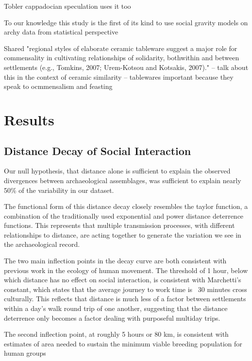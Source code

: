 \documentclass[fleqn,10pt]{wlscirep}
\begin{document}
Tobler cappadocian speculation uses it too

To our knowledge this study is the first of its kind to use social gravity models on archy data from statistical perspective




Shared
"regional styles of elaborate ceramic tableware suggest a major role for commensality in cultivating relationships of solidarity, bothwithin and between settlements (e.g., Tomkins, 2007; Urem-Kotsou
and Kotsakis, 2007)." -- talk about this in the context of ceramic similarity -- tablewares important because they speak to ocmmensalism and feasting

\section*{Results}

\subsection*{Distance Decay of Social Interaction}
Our null hypothesis, that distance alone is sufficient to explain the observed divergences between archaeological assemblages, was sufficient to explain nearly 50\% of the variability in our dataset. 

The functional form of this distance decay closely resembles the taylor function, a combination of the traditionally used exponential and power distance deterrence functions. This represents that multiple transmission processes, with different relationships to distance, are acting together to generate the variation we see in the archaeological record.

The two main inflection points in the decay curve are both consistent with previous work in the ecology of human movement. The threshold of 1 hour, below which distance has no effect on social interaction, is consistent with Marchetti's constant, which states that the average journey to work time is ~30 minutes cross culturally. This reflects that distance is much less of a factor between settlements within a day's walk round trip of one another, suggesting that the distance deterrence only becomes a factor dealing with purposeful multiday trips. 

The second inflection point, at roughly 5 hours or 80 km, is consistent with estimates of area needed to sustain the minimum viable breeding population for human groups
\end{document}
